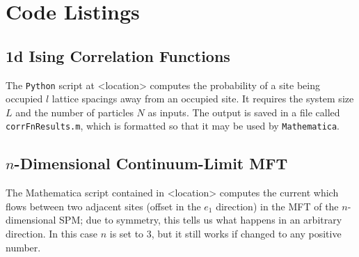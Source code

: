 \chapter{Code Listings}

\section{1d Ising Correlation Functions \label{sec:corrFnCode} }

The \texttt{Python} script at <location> computes the probability of a site being occupied $l$ lattice spacings away from an occupied site.
It requires the system size $L$ and the number of particles $N$ as inputs. The output is saved in a file called \texttt{corrFnResults.m}, which is formatted so that it may be used by \texttt{Mathematica}.



\section{$n$-Dimensional Continuum-Limit MFT \label{sec:mftCode}}

The Mathematica script contained in <location> computes the current which flows between two adjacent sites
(offset in the $e_1$ direction) in the MFT of the $n$-dimensional SPM; due to symmetry, this tells us
what happens in an arbitrary direction. In this case $n$ is set to $3$,
but it still works if changed to any positive number.


